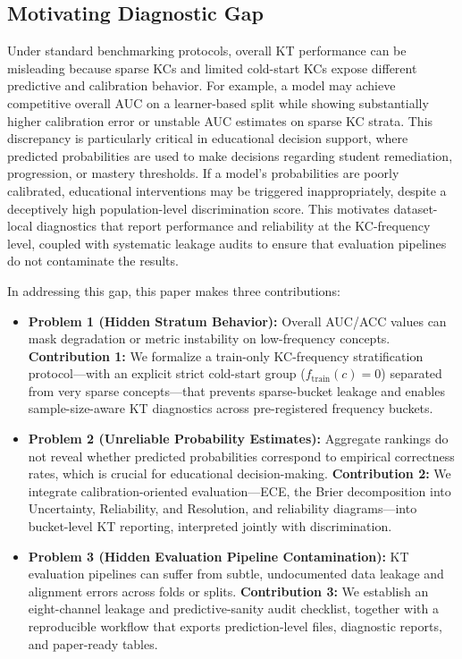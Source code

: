 \subsection{Motivating Diagnostic Gap}
Under standard benchmarking protocols, overall KT performance can be misleading because sparse KCs and limited cold-start KCs expose different predictive and calibration behavior. For example, a model may achieve competitive overall AUC on a learner-based split while showing substantially higher calibration error or unstable AUC estimates on sparse KC strata. This discrepancy is particularly critical in educational decision support, where predicted probabilities are used to make decisions regarding student remediation, progression, or mastery thresholds. If a model's probabilities are poorly calibrated, educational interventions may be triggered inappropriately, despite a deceptively high population-level discrimination score. This motivates dataset-local diagnostics that report performance and reliability at the KC-frequency level, coupled with systematic leakage audits to ensure that evaluation pipelines do not contaminate the results.

In addressing this gap, this paper makes three contributions:
\begin{itemize}
    \item \textbf{Problem 1 (Hidden Stratum Behavior):} Overall AUC/ACC values can mask degradation or metric instability on low-frequency concepts. 
    \textbf{Contribution 1:} We formalize a train-only KC-frequency stratification protocol---with an explicit strict cold-start group ($f_{\mathrm{train}}(c) = 0$) separated from very sparse concepts---that prevents sparse-bucket leakage and enables sample-size-aware KT diagnostics across pre-registered frequency buckets.
    \item \textbf{Problem 2 (Unreliable Probability Estimates):} Aggregate rankings do not reveal whether predicted probabilities correspond to empirical correctness rates, which is crucial for educational decision-making. 
    \textbf{Contribution 2:} We integrate calibration-oriented evaluation---ECE, the Brier decomposition into Uncertainty, Reliability, and Resolution, and reliability diagrams---into bucket-level KT reporting, interpreted jointly with discrimination.
    \item \textbf{Problem 3 (Hidden Evaluation Pipeline Contamination):} KT evaluation pipelines can suffer from subtle, undocumented data leakage and alignment errors across folds or splits. 
    \textbf{Contribution 3:} We establish an eight-channel leakage and predictive-sanity audit checklist, together with a reproducible workflow that exports prediction-level files, diagnostic reports, and paper-ready tables.
\end{itemize}

